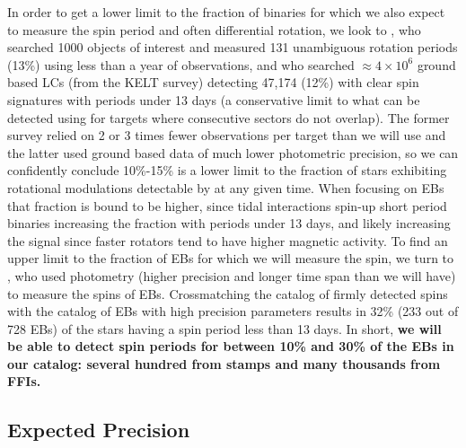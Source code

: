 In order to get a lower limit to the fraction of binaries for which we also
expect to measure the spin period and often differential rotation, we look to
\citep{CantoMartins_et_al_20}, who searched 1000 \tess{} objects of interest and
measured 131 unambiguous rotation periods (13\%) using less than a year of
observations, and \citep{Oelkers_et_al_18} who searched $\approx4\times10^6$
ground based LCs (from the KELT survey) detecting 47,174 (12\%) with clear spin
signatures with periods under 13 days (a conservative limit to what can be
detected using \tess{} for targets where consecutive sectors do not overlap).
The former survey relied on 2 or 3 times fewer observations per target than we
will use and the latter used ground based data of much lower photometric
precision, so we can confidently conclude 10\%-15\% is a lower limit to the
fraction of stars exhibiting rotational modulations detectable by \tess{} at any
given time. When focusing on EBs that fraction is bound to be higher, since
tidal interactions spin-up short period binaries increasing the fraction with
periods under 13 days, and likely increasing the signal since faster rotators
tend to have higher magnetic activity. To find an upper limit to the fraction of
EBs for which we will measure the spin, we turn to \citep{Lurie_et_al_17}, who
used \kepler{} photometry (higher precision and longer time span than we will
have) to measure the spins of EBs. Crossmatching the \citep{Lurie_et_al_17}
catalog of firmly detected spins with the \citep{Windemuth_et_al_19} catalog of
EBs with high precision parameters results in 32\% (233 out of 728 EBs) of the
\citep{Windemuth_et_al_19} stars having a spin period less than 13 days. In
short, \textbf{we will be able to detect spin periods for between 10\% and 30\%
of the EBs in our catalog: several hundred from stamps and many thousands from
FFIs.}

\subsection{Expected Precision}
%
\label{sec:expected_precision}

